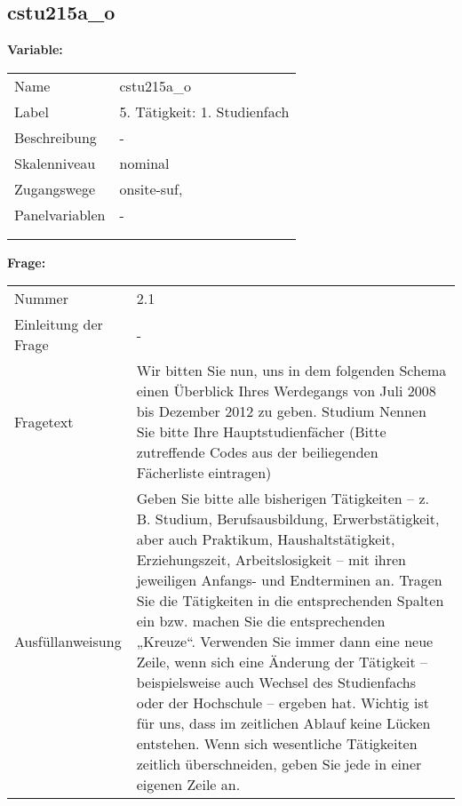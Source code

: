 	
	
	\subsection{cstu215a\_o}
	\label{subSection:cstu215a_o}

	\noindent\textbf{Variable:}\\
		\begin{tabular}{lL{11.3cm}}
			\label{tableVariable:cstu215a_o}
			Name & cstu215a\_o \\
			Label & 5. Tätigkeit: 1. Studienfach \\
			Beschreibung & - \\
			Skalenniveau & nominal \\
			Zugangswege &
				onsite-suf,
 \\
			Panelvariablen & -
			 \\
			 \\
 \\
		\end{tabular}

		\vspace*{1 cm}
		\noindent\textbf{Frage:}\\
		\begin{tabular}{lL{11.3cm}}
			\label{tableQuestion:cstu215a_o}
			Nummer & 2.1 \\
			Einleitung der Frage & - \\
			Fragetext & Wir bitten Sie nun, uns in dem folgenden Schema einen Überblick Ihres Werdegangs von Juli 2008 bis Dezember 2012 zu geben.
Studium
Nennen Sie bitte Ihre Hauptstudienfächer
(Bitte zutreffende Codes aus der beiliegenden Fächerliste eintragen) \\
			Ausfüllanweisung & Geben Sie bitte alle bisherigen Tätigkeiten – z. B. Studium, Berufsausbildung, Erwerbstätigkeit, aber auch Praktikum, Haushaltstätigkeit,
Erziehungszeit, Arbeitslosigkeit – mit ihren jeweiligen Anfangs- und Endterminen an. Tragen Sie die Tätigkeiten in die entsprechenden Spalten ein bzw. machen Sie die entsprechenden „Kreuze“. Verwenden Sie immer dann eine neue Zeile, wenn sich eine Änderung der Tätigkeit – beispielsweise auch Wechsel des Studienfachs oder der Hochschule – ergeben hat. Wichtig ist für uns, dass im zeitlichen Ablauf keine Lücken entstehen. Wenn sich wesentliche Tätigkeiten zeitlich überschneiden, geben Sie jede in einer eigenen Zeile an. \\
		\end{tabular}





